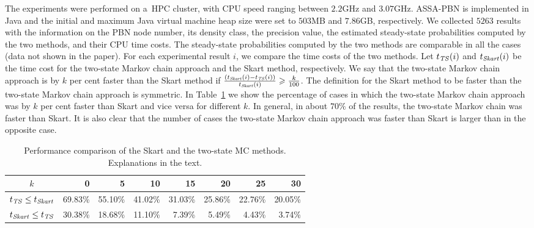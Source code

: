 \documentclass[runningheads,a4paper]{llncs}
\begin{document}
The experiments were performed on a~HPC cluster, with CPU speed ranging between $2.2$GHz and
$3.07$GHz. {\sf ASSA-PBN} is implemented in Java and the initial and maximum Java virtual machine
heap size were set to $503$MB and $7.86$GB, respectively. We collected $5263$ results with
the information on the PBN node number, its density class, the precision value, the estimated
steady-state probabilities computed by the two methods, and their CPU time costs. The steady-state
probabilities computed by the two methods are comparable in all the cases (data not shown in the
paper). For each experimental result $i$, we compare the time costs of the two methods. Let
$t_{\it TS}(i)$ and $t_{\it Skart}(i)$ be the time cost for the two-state Markov chain approach
and the Skart method, respectively. We say that the two-state Markov chain approach is by $k$ per
cent faster than the Skart method if $\frac{(t_{\it Skart}(i)-t_{\it TS}(i))}{t_{\it
Skart}(i)}\geqslant \frac{k}{100} $. The definition for the Skart method to be faster than the
two-state Markov chain approach is symmetric. In Table~\ref{tab:compare} we show the percentage of
cases in which the two-state Markov chain approach was by $k$ per cent faster than Skart and vice
versa for different $k$. In general, in about $70\%$ of the results, the two-state Markov chain
was faster than Skart. It is also clear that the number of cases the two-state Markov chain
approach was faster than Skart is larger than in the opposite case.

\begin{table}[!t]
  \centering
  \begin{tabular}{| c || r| r| r|  r| r| r| r|}
  \hline
  $k$ & 0 & 5 & 10 & 15 & 20 & 25 &30\\
  \hline\hline
  $t_{\it TS}\le t_{\it Skart}$ & \hspace{2mm}69.83\%	&\hspace{2mm}55.10\% &\hspace{2mm}41.02\%
  &\hspace{2mm}31.03\% &\hspace{2mm}25.86\% &\hspace{2mm}	22.76\% &\hspace{2mm}20.05\%\\
  \hline
  $t_{\it Skart}\le t_{\it TS}$ &30.38\% &18.68\%	&11.10\% &7.39\% &5.49\% &4.43\% &3.74\%\\
  \hline
  \end{tabular}
  \caption{Performance comparison of the Skart and the two-state MC methods. Explanations in the
  text.}\label{tab:compare}
\end{table}
\end{document}
